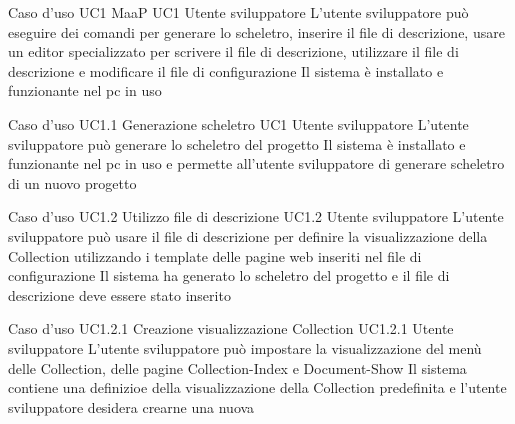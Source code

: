 

\UCtitle
{Caso d'uso UC1}
{MaaP}
\UC
{UC1}
{Utente sviluppatore}
{L'utente sviluppatore  può eseguire dei comandi per generare lo scheletro, inserire il file di descrizione, usare un editor specializzato per scrivere il file di descrizione, utilizzare il file di descrizione e modificare il file di configurazione}
{Il sistema è installato e funzionante nel pc in uso}

\UCtitle
{Caso d'uso UC1.1}
{Generazione scheletro}
\UC
{UC1}
{Utente sviluppatore}
{L'utente sviluppatore può generare lo scheletro del progetto}
{Il sistema è installato e funzionante nel pc in uso e permette all'utente sviluppatore di generare scheletro di un nuovo progetto}



\UCtitle
{Caso d'uso UC1.2}
{Utilizzo file di descrizione}
\UC
{UC1.2}
{Utente sviluppatore}
{L'utente sviluppatore  può usare il file di descrizione per definire la visualizzazione della Collection utilizzando i template delle pagine web inseriti nel file di configurazione}
{Il sistema ha generato lo scheletro del progetto e il file di descrizione deve essere stato inserito}

\UCtitle
{Caso d'uso UC1.2.1}
{Creazione visualizzazione Collection}
\UC
{UC1.2.1}
{Utente sviluppatore}
{L'utente sviluppatore  può impostare la visualizzazione del menù delle Collection, delle pagine Collection-Index e Document-Show}
{Il sistema contiene una definizioe della visualizzazione della Collection predefinita e l'utente sviluppatore desidera crearne una nuova}

